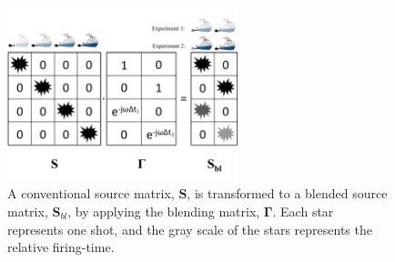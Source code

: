 \begin{figure}
	
	\centering
	\includegraphics[width=0.6\textwidth]{Plots/Blended-Source-edit2}
	\caption{A conventional source matrix, $\mathbf{S}$, is transformed to a blended source matrix, $\mathbf{S}_{bl}$, by applying the blending matrix, $\mathbf{\Gamma}$. Each star represents one shot, and the gray scale of the stars represents the relative firing-time.}
	\label{fig:Ch-Theory-BlendedSource}
\end{figure}


